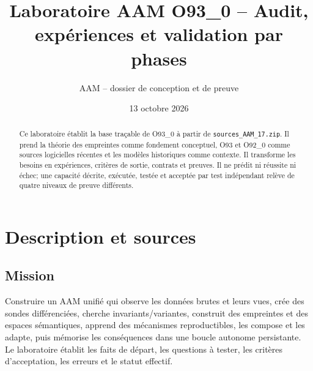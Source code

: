 \documentclass[11pt,a4paper]{report}
\title{Laboratoire AAM O93\_0 -- Audit, expériences et validation par phases}\author{AAM -- dossier de conception et de preuve}\date{13 octobre 2026}
\begin{document}
\maketitle
\begin{abstract}Ce laboratoire établit la base traçable de O93\_0 à partir de \texttt{sources\_AAM\_17.zip}. Il prend la théorie des empreintes comme fondement conceptuel, O93 et O92\_0 comme sources logicielles récentes et les modèles historiques comme contexte. Il transforme les besoins en expériences, critères de sortie, contrats et preuves. Il ne prédit ni réussite ni échec; une capacité décrite, exécutée, testée et acceptée par test indépendant relève de quatre niveaux de preuve différents.\end{abstract}
\tableofcontents
\chapter{Description et sources}
\section{Mission}Construire un AAM unifié qui observe les données brutes et leurs vues, crée des sondes différenciées, cherche invariants/variantes, construit des empreintes et des espaces sémantiques, apprend des mécanismes reproductibles, les compose et les adapte, puis mémorise les conséquences dans une boucle autonome persistante. Le laboratoire établit les faits de départ, les questions à tester, les critères d'acceptation, les erreurs et le statut effectif.
\end{document}
